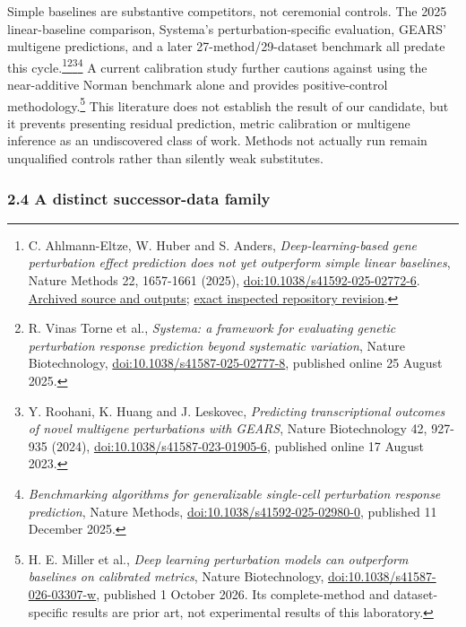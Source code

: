 \documentclass[
  10pt,
]{article}
\begin{document}
Simple baselines are substantive competitors, not ceremonial controls.
The 2025 linear-baseline comparison, Systema's perturbation-specific
evaluation, GEARS' multigene predictions, and a later
27-method/29-dataset benchmark all predate this
cycle.\footnote{C. Ahlmann-Eltze, W. Huber and S. Anders,
  \emph{Deep-learning-based gene perturbation effect prediction does not
  yet outperform simple linear baselines}, Nature Methods 22, 1657-1661
  (2025),
  \href{https://doi.org/10.1038/s41592-025-02772-6}{doi:10.1038/s41592-025-02772-6}.
  \href{https://doi.org/10.5281/zenodo.16092690}{Archived source and
  outputs};
  \href{https://github.com/const-ae/linear_perturbation_prediction-Paper/tree/bfa6eeea2bd145a1af2ec0127a2e808cc38456a9}{exact
  inspected repository revision}.}\footnote{R. Vinas Torne et al.,
  \emph{Systema: a framework for evaluating genetic perturbation
  response prediction beyond systematic variation}, Nature
  Biotechnology,
  \href{https://doi.org/10.1038/s41587-025-02777-8}{doi:10.1038/s41587-025-02777-8},
  published online 25 August 2025.}\footnote{Y. Roohani, K. Huang and J.
  Leskovec, \emph{Predicting transcriptional outcomes of novel multigene
  perturbations with GEARS}, Nature Biotechnology 42, 927-935 (2024),
  \href{https://doi.org/10.1038/s41587-023-01905-6}{doi:10.1038/s41587-023-01905-6},
  published online 17 August 2023.}\footnote{\emph{Benchmarking
  algorithms for generalizable single-cell perturbation response
  prediction}, Nature Methods,
  \href{https://doi.org/10.1038/s41592-025-02980-0}{doi:10.1038/s41592-025-02980-0},
  published 11 December 2025.} A current calibration study further
cautions against using the near-additive Norman benchmark alone and
provides positive-control methodology.\footnote{H. E. Miller et al.,
  \emph{Deep learning perturbation models can outperform baselines on
  calibrated metrics}, Nature Biotechnology,
  \href{https://doi.org/10.1038/s41587-026-03307-w}{doi:10.1038/s41587-026-03307-w},
  published 1 October 2026. Its complete-method and dataset-specific
  results are prior art, not experimental results of this laboratory.}
This literature does not establish the result of our candidate, but it
prevents presenting residual prediction, metric calibration or multigene
inference as an undiscovered class of work. Methods not actually run
remain unqualified controls rather than silently weak substitutes.

\hypertarget{a-distinct-successor-data-family}{%
\subsubsection{2.4 A distinct successor-data
family}\label{a-distinct-successor-data-family}}
\end{document}
